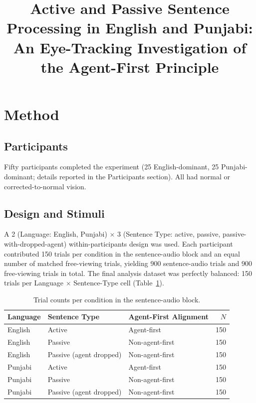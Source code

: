 \documentclass[12pt, a4paper]{article}
\title{Active and Passive Sentence Processing in English and Punjabi:\\
       An Eye-Tracking Investigation of the Agent-First Principle}
\author{}
\date{}
\begin{document}
\maketitle

\section{Method}

\subsection{Participants}

Fifty participants completed the experiment (25 English-dominant, 25 Punjabi-dominant;
details reported in the Participants section). All had normal or corrected-to-normal vision.

\subsection{Design and Stimuli}

A 2 (Language: English, Punjabi) $\times$ 3 (Sentence Type: active, passive,
passive-with-dropped-agent) within-participants design was used.
Each participant contributed 150 trials per condition in the sentence-audio
block and an equal number of matched free-viewing trials, yielding 900
sentence-audio trials and 900 free-viewing trials in total.
The final analysis dataset was perfectly balanced: 150 trials per
Language $\times$ Sentence-Type cell (Table~\ref{tab:design}).

\begin{table}[h]
\centering
\caption{Trial counts per condition in the sentence-audio block.}
\label{tab:design}
\begin{tabular}{lll r}
\toprule
Language & Sentence Type & Agent-First Alignment & $N$ \\
\midrule
English  & Active                & Agent-first     & 150 \\
English  & Passive               & Non-agent-first & 150 \\
English  & Passive (agent dropped) & Non-agent-first & 150 \\
Punjabi  & Active                & Agent-first     & 150 \\
Punjabi  & Passive               & Non-agent-first & 150 \\
Punjabi  & Passive (agent dropped) & Non-agent-first & 150 \\
\bottomrule
\end{tabular}
\end{table}
\end{document}

